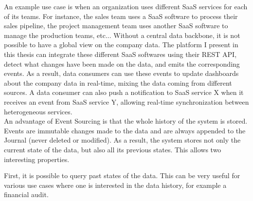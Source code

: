 An example use case is when an organization uses different SaaS services for each of its teams. For instance, the sales
team uses a SaaS software to process their sales pipeline, the project management team uses another SaaS software to manage
the production teams, etc... Without a central data backbone, it is not possible to have a global view on the company data.
The platform I present in this thesis can integrate these different SaaS softwares using their REST API, detect what
changes have been made on the data, and emits the corresponding events. As a result, data consumers can use these events
to update dashboards about the company data in real-time, mixing the data coming from different sources. A data consumer can also push a
notification to SaaS service X when it receives an event from SaaS service Y, allowing real-time synchronization between
heterogeneous services.
\\

An advantage of Event Sourcing is that the whole history of the system is stored. Events are immutable changes made to the data
and are always appended to the Journal (never deleted or modified). As a result, the system stores not only the current state
of the data, but also all its previous states. This allows two interesting properties.

First, it is possible to query past states of the data. This can be very useful for various use cases
where one is interested in the data history, for example a financial audit.

